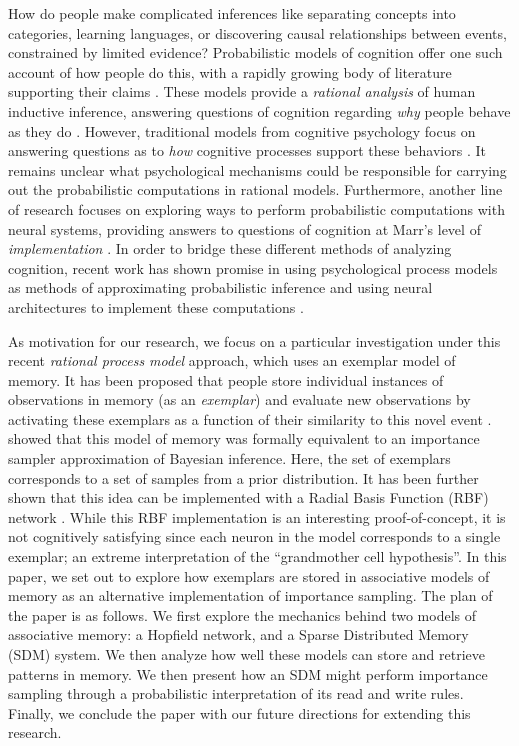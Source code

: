 \documentclass[10pt,letterpaper]{article}
\begin{document}
How do people make complicated inferences like separating concepts into categories, learning languages, or discovering causal relationships between events, constrained by limited evidence? Probabilistic models of cognition offer one such account of how people do this, with a rapidly growing body of literature supporting their claims \cite{griffiths2010probabilistic,tenenbaum2011grow}. These models provide a \textit{rational analysis} of human inductive inference, answering questions of cognition regarding \textit{why} people behave as they do \cite{marr82,anderson90}. However, traditional models from cognitive psychology focus on answering questions as to \textit{how} cognitive processes support these behaviors \cite{kahneman1972subjective,gigerenzer2000simple}. It remains unclear what psychological mechanisms could be responsible for carrying out the probabilistic computations in rational models. Furthermore, another line of research focuses on exploring ways to perform probabilistic computations with neural systems, providing answers to questions of cognition at Marr's level of \textit{implementation} \cite{ma2006bayesian}. In order to bridge these different methods of analyzing cognition, recent work has shown promise in using psychological process models as methods of approximating probabilistic inference \cite{Shi2010,sanborn2010rational,griffiths2012bridging} and using neural architectures to implement these computations \cite{Shi2009}. 

As motivation for our research, we focus on a particular investigation under this recent \textit{rational process model} approach, which uses an exemplar model of memory. It has been proposed that people store individual instances of observations in memory (as an \textit{exemplar}) and evaluate new observations by activating these exemplars as a function of their similarity to this novel event \cite{medin1978context,nosofsky1986attention}.  showed that this model of memory was formally equivalent to an importance sampler approximation of Bayesian inference. Here, the set of exemplars corresponds to a set of samples from a prior distribution. It has been further shown that this idea can be implemented with a Radial Basis Function (RBF) network \cite{Shi2009}. While this RBF implementation is an interesting proof-of-concept, it is not cognitively satisfying since each neuron in the model corresponds to a single exemplar; an extreme interpretation of the ``grandmother cell hypothesis''. In this paper, we set out to explore how exemplars are stored in associative models of memory as an alternative implementation of importance sampling. The plan of the paper is as follows. We first explore the mechanics behind two models of associative memory: a Hopfield network, and a Sparse Distributed Memory (SDM) system. We then analyze how well these models can store and retrieve patterns in memory. We then present how an SDM might perform importance sampling through a probabilistic interpretation of its read and write rules. Finally, we conclude the paper with our future directions for extending this research.
\end{document}
